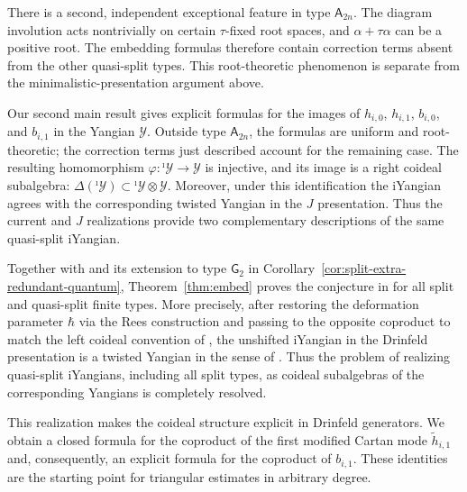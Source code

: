 \documentclass[11pt,reqno]{amsart}
\numberwithin{equation}{section}
\theoremstyle{definition}
\theoremstyle{remark}
\newcommand{\tl}{\tilde}
\newcommand{\Y}{{\mathscr{Y}}}
\newcommand{\Yi}{{^\imath\mathscr{Y}}}
\begin{document}
There is a second, independent exceptional feature in type $\mathsf A_{2n}$. The diagram involution acts nontrivially on certain $\tau$-fixed root spaces, and $\alpha+\tau\alpha$ can be a positive root. The embedding formulas therefore contain correction terms absent from the other quasi-split types. This root-theoretic phenomenon is separate from the minimalistic-presentation argument above.

Our second main result gives explicit formulas for the images of $h_{i,0}$, $h_{i,1}$, $b_{i,0}$, and $b_{i,1}$ in the Yangian $\Y$. Outside type $\mathsf A_{2n}$, the formulas are uniform and root-theoretic; the correction terms just described account for the remaining case. The resulting homomorphism $\varphi:\Yi\longrightarrow\Y$ is injective, and its image is a right coideal subalgebra: $\Delta(\Yi)\subset \Yi\otimes\Y$.
Moreover, under this identification the iYangian agrees with the corresponding twisted Yangian in the $J$ presentation. Thus the current and $J$ realizations provide two complementary descriptions of the same quasi-split iYangian.

Together with \cite[Theorem~4.1]{Lu26min} and its extension to type $\mathsf G_2$ in Corollary~\ref{cor:split-extra-redundant-quantum}, Theorem~\ref{thm:embed} proves the conjecture in \cite[Remark~3.23]{LWW25} for all split and quasi-split finite types.
More precisely, after restoring the deformation parameter $\hbar$ via the
Rees construction and passing to the opposite coproduct to match the
left coideal convention of \cite{LWW25}, the unshifted iYangian in the
Drinfeld presentation is a twisted Yangian in the sense of
\cite[Definition~3.15]{LWW25}. Thus the problem of realizing quasi-split
iYangians, including all split types, as coideal subalgebras of the
corresponding Yangians is completely resolved.

This realization makes the coideal structure explicit in Drinfeld generators. We obtain a closed formula for the coproduct of the first modified Cartan mode $\tl h_{i,1}$ and, consequently, an explicit formula for the coproduct of $b_{i,1}$. These identities are the starting point for triangular estimates in arbitrary degree.
\end{document}
